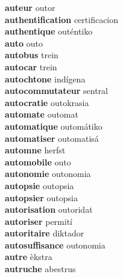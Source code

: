 \textbf{auteur } outor \\
\textbf{authentification } certificacion \\
\textbf{authentique } outéntiko \\
\textbf{auto } outo \\
\textbf{autobus } trein \\
\textbf{autocar } trein \\
\textbf{autochtone } indígena \\
\textbf{autocommutateur } sentral \\
\textbf{autocratie } outokrasia \\
\textbf{automate } outomat \\
\textbf{automatique } outomátiko \\
\textbf{automatiser } outomatisá \\
\textbf{automne } herfst \\
\textbf{automobile } outo \\
\textbf{autonomie } outonomia \\
\textbf{autopsie } outopsia \\
\textbf{autopsier } outopsia \\
\textbf{autorisation } outoridat \\
\textbf{autoriser } permití \\
\textbf{autoritaire } diktador \\
\textbf{autosuffisance } outonomia \\
\textbf{autre } èkstra \\
\textbf{autruche } abestrus \\
